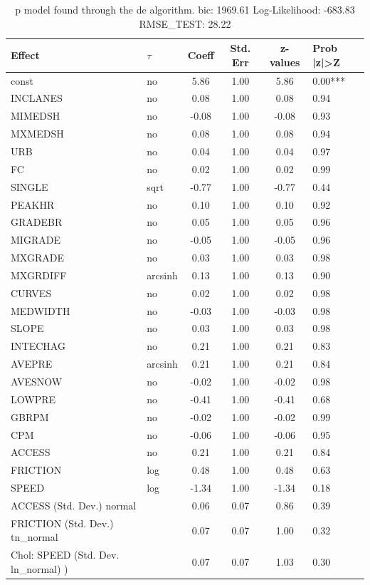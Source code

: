 \begin{table}
	\caption{p model found through the de algorithm. bic: 1969.61 Log-Likelihood: -683.83 RMSE_TEST: 28.22}
	\begin{center}
		\begin{tabular}{|l|l|c|c|c|l|}
			\hline
			Effect & $\tau$ & Coeff & Std. Err & z-values & Prob |z|>Z \\
			\hline
			const & no & 5.86 & 1.00 & 5.86 & 0.00*** \\
			\hline
			INCLANES & no & 0.08 & 1.00 & 0.08 & 0.94 \\
			\hline
			MIMEDSH & no & -0.08 & 1.00 & -0.08 & 0.93 \\
			\hline
			MXMEDSH & no & 0.08 & 1.00 & 0.08 & 0.94 \\
			\hline
			URB & no & 0.04 & 1.00 & 0.04 & 0.97 \\
			\hline
			FC & no & 0.02 & 1.00 & 0.02 & 0.99 \\
			\hline
			SINGLE & sqrt & -0.77 & 1.00 & -0.77 & 0.44 \\
			\hline
			PEAKHR & no & 0.10 & 1.00 & 0.10 & 0.92 \\
			\hline
			GRADEBR & no & 0.05 & 1.00 & 0.05 & 0.96 \\
			\hline
			MIGRADE & no & -0.05 & 1.00 & -0.05 & 0.96 \\
			\hline
			MXGRADE & no & 0.03 & 1.00 & 0.03 & 0.98 \\
			\hline
			MXGRDIFF & arcsinh & 0.13 & 1.00 & 0.13 & 0.90 \\
			\hline
			CURVES & no & 0.02 & 1.00 & 0.02 & 0.98 \\
			\hline
			MEDWIDTH & no & -0.03 & 1.00 & -0.03 & 0.98 \\
			\hline
			SLOPE & no & 0.03 & 1.00 & 0.03 & 0.98 \\
			\hline
			INTECHAG & no & 0.21 & 1.00 & 0.21 & 0.83 \\
			\hline
			AVEPRE & arcsinh & 0.21 & 1.00 & 0.21 & 0.84 \\
			\hline
			AVESNOW & no & -0.02 & 1.00 & -0.02 & 0.98 \\
			\hline
			LOWPRE & no & -0.41 & 1.00 & -0.41 & 0.68 \\
			\hline
			GBRPM & no & -0.02 & 1.00 & -0.02 & 0.99 \\
			\hline
			CPM & no & -0.06 & 1.00 & -0.06 & 0.95 \\
			\hline
			ACCESS & no & 0.21 & 1.00 & 0.21 & 0.84 \\
			\hline
			FRICTION & log & 0.48 & 1.00 & 0.48 & 0.63 \\
			\hline
			SPEED & log & -1.34 & 1.00 & -1.34 & 0.18 \\
			\hline
			ACCESS (Std. Dev.) normal &  & 0.06 & 0.07 & 0.86 & 0.39 \\
			\hline
			FRICTION (Std. Dev.) tn_normal &  & 0.07 & 0.07 & 1.00 & 0.32 \\
			\hline
			 Chol: SPEED (Std. Dev. ln_normal) ) &  & 0.07 & 0.07 & 1.03 & 0.30 \\
			\hline
		\end{tabular}
	\end{center}
\end{table}